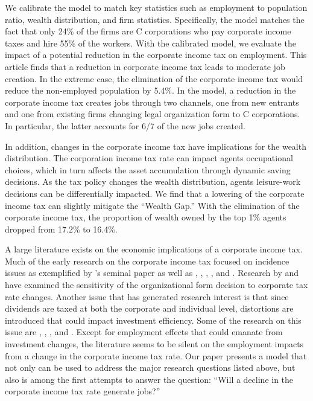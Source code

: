 \documentclass[12pt]{article}
\begin{document}
We calibrate the model to match key statistics such as employment to population ratio, wealth distribution, and firm statistics. Specifically, the model matches the fact that only 24\% of the firms are C corporations who pay corporate income taxes and hire 55\% of the workers. With the calibrated model, we evaluate the impact of a potential reduction in the corporate income tax on employment. This article finds that a reduction in corporate income tax leads to moderate job creation. In the extreme case, the elimination of the corporate income tax would reduce the non-employed population by 5.4\%. In the model, a reduction in the corporate income tax creates jobs through two channels, one from new entrants and one from existing firms changing legal organization form to C corporations. In particular, the latter accounts for 6/7 of the new jobs created.


In addition, changes in the corporate income tax have
implications for the wealth distribution. The corporation income tax rate
can impact agents occupational choices, which in turn affects the asset
accumulation through dynamic saving decisions. As the tax policy changes the
wealth distribution, agents leisure-work decisions can be differentially
impacted. We find that a lowering of the corporate income tax can slightly mitigate the ``Wealth Gap.'' With the elimination of the corporate income tax, the proportion of wealth owned by the top 1\% agents dropped from 17.2\% to 16.4\%. 


A large literature exists on the economic implications of a corporate income
tax. Much of the early research on the corporate income tax focused on
incidence issues as exemplified by \citet{Harberger1962}'s seminal paper as
well as \citet{Ballard1985}, \citet{Feldstein1978}, \citet{Feldstein1980}, %
\citet{Gravelle1989}, and \citet{Shoven1976}. Research by %
\citet{Goolsbee2004} and \citet{Gordon1994} have examined the sensitivity of
the organizational form decision to corporate tax rate changes. Another
issue that has generated research interest is that since dividends are taxed
at both the corporate and individual level, distortions are introduced that
could impact investment efficiency. Some of the research on this issue are %
\citet{Auerbach2002}, \citet{Jensen1986}, \citet{Chetty2005}, and %
\citet{Gourio2010}. Except for employment effects that could emanate from
investment changes, the literature seems to be silent on the employment
impacts from a change in the corporate income tax rate. Our paper presents a
model that not only can be used to address the major research questions
listed above, but also is among the first attempts to answer the question:
``Will a decline in the corporate income tax rate generate jobs?''
\end{document}
